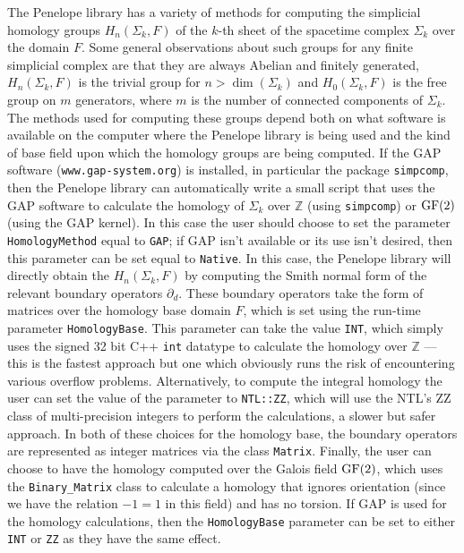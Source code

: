 \documentclass[12pt,letterpaper]{report}
\begin{document}
The Penelope library has a variety of methods for computing the simplicial homology groups $H_n(\Sigma_k,F)$ 
of the $k$-th sheet of the spacetime complex $\Sigma_k$ over the domain $F$. Some general observations about 
such groups for any finite simplicial complex are that they are always Abelian and finitely generated, 
$H_n(\Sigma_k,F)$ is the trivial group for $n > \dim(\Sigma_k)$ and $H_0(\Sigma_k,F)$ is the free group 
on $m$ generators, where $m$ is the number of connected components of $\Sigma_k$. The methods used for 
computing these groups depend both on what software is available on the computer where the Penelope library 
is being used and the kind of base field upon which the homology groups are being computed. If the GAP software 
(\texttt{www.gap-system.org}) is installed, in particular the package \texttt{simpcomp}, then the Penelope 
library can automatically write a small script that uses the GAP software to calculate the homology of 
$\Sigma_k$ over $\mathbb{Z}$ (using \texttt{simpcomp}) or $\textnormal{GF}(2)$ (using the GAP kernel). In 
this case the user should choose to set the parameter \texttt{HomologyMethod} equal to \texttt{GAP}; if GAP 
isn't available or its use isn't desired, then this parameter can be set equal to \texttt{Native}. In this 
case, the Penelope library will directly obtain the $H_n(\Sigma_k,F)$ by computing the Smith normal form of 
the relevant boundary operators $\partial_d$. These boundary operators take the form of matrices over the 
homology base domain $F$, which is set using the run-time parameter \texttt{HomologyBase}. This parameter 
can take the value \texttt{INT}, which simply uses the signed 32 bit C++ \texttt{int} datatype to calculate 
the homology over $\mathbb{Z}$ --- this is the fastest approach but one which obviously runs the risk of 
encountering various overflow problems. Alternatively, to compute the integral homology the user can set 
the value of the parameter to \texttt{NTL::ZZ}, which will use the NTL's ZZ class of multi-precision integers 
to perform the calculations, a slower but safer approach. In both of these choices for the homology base, 
the boundary operators are represented as integer matrices via the class \texttt{Matrix}. Finally, the 
user can choose to have the homology computed over the Galois field $\textnormal{GF}(2)$, which uses 
the \texttt{Binary\_Matrix} class to calculate a homology that ignores orientation (since we have the 
relation $-1 =1$ in this field) and has no torsion. If GAP is used for the homology calculations, then 
the \texttt{HomologyBase} parameter can be set to either \texttt{INT} or \texttt{ZZ} as they have the 
same effect.  
\end{document}
